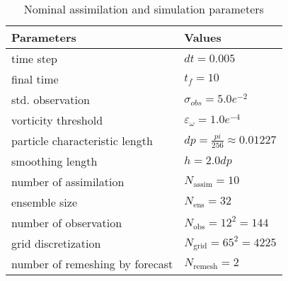 \begin{table}[htbp]
    \centering
    \caption{Nominal assimilation and simulation parameters}
    \begin{tabular}[t]{|l|l|}
        \hline
        Parameters                      & Values                                   \\
        \hline
        time step                       & $dt = 0.005$                             \\
        final time                      & $t_f =10$                                \\
        std. observation                & $\sigma_{obs} =  5.0e^{-2}$              \\
        vorticity threshold             & $\varepsilon_{\omega} = 1.0e^{-4}$       \\
        particle characteristic length  & $dp = \frac{pi}{256} \approx 0.01227 $ \\
        smoothing length                & $h = 2.0 dp$                             \\
        number of assimilation          & $N_{\text{assim}} = 10$                  \\
        ensemble size                   & $N_{\text{ens}} = 32$                    \\
        number of observation           & $N_{\text{obs}} = 12^2 = 144$            \\
        grid discretization             & $N_{\text{grid}} = 65^2 = 4225$          \\
        number of remeshing by forecast & $N_{\text{remesh}} =  2 $                \\
        \hline
    \end{tabular}
    \label{tab:simu_2d}
\end{table}

